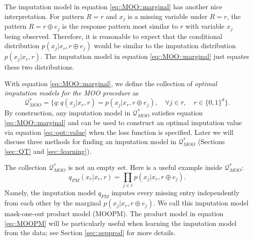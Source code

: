 \documentclass[aos, preprint]{imsart}
\theoremstyle{plain}
\theoremstyle{definition}
\let\hat\widehat
\begin{document}
The imputation model  in equation \eqref{eq::MOO::marginal}
has another nice interpretation. For pattern $R=r$ and $x_j$ is a missing variable under $R=r$, the
pattern $R=r\oplus e_j$ is the response pattern most similar to $r$ with variable $x_j$ being observed. 
Therefore, it is reasonable to expect that the conditional distribution $p(x_j|x_r, r\oplus e_j)$ would be
similar to the imputation distribution $p(x_j|x_r, r)$.
The imputation model in equation \eqref{eq::MOO::marginal} just equates these two distributions.


With equation \eqref{eq::MOO::marginal},
we define the collection of \emph{optimal imputation models for the MOO procedure} as 
\begin{equation}
\mathcal{Q}^*_{MOO} =\{q: q(x_j|x_r, r) = p(x_j|x_r, r\oplus e_j), \quad \forall j \in \bar r,\quad r \in\{0,1\}^d\}.
\label{eq::MOO::opt::set}
\end{equation}
By construction, any imputation model
in $\mathcal{Q}^*_{MOO}$ 
satisfies equation \eqref{eq::MOO::marginal}
and can be used to construct an optimal imputation value via equation \eqref{eq::opt::value}
when the loss function is specified.
Later we will discuss three methods for finding an imputation model in $\mathcal{Q}^*_{MOO}$ (Sections \ref{sec::QT} and \ref{sec::learning}).




The collection $\mathcal{Q}^*_{MOO}$ is not 
an empty set. 
Here is a useful example inside $\mathcal{Q}^*_{MOO}$:
\begin{equation}
q_{PM}(x_{\bar r}|x_r,r) = \prod_{j\in \bar r} p(x_j|x_r, r\oplus e_j).
\label{eq::MOOPM}
\end{equation}
Namely, the imputation model $q_{PM}$
imputes every missing entry independently from each other
by the marginal $p(x_j|x_r, r\oplus e_j)$. 
We call this imputation model mask-one-out product model (MOOPM).
The product model in equation \eqref{eq::MOOPM} will be 
particularly useful when learning the imputation model
from the data; see Section \ref{sec::sepprod} for more details.


\end{document}
